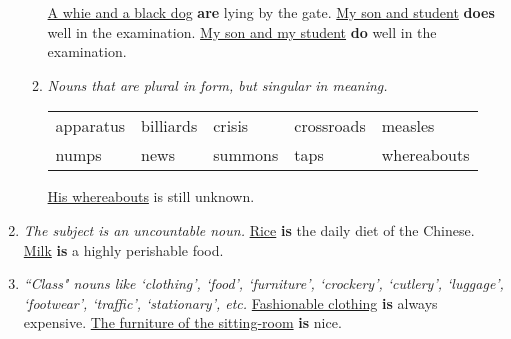 \begin{enumerate}
\begin{enumerate}
                \newline
                \underline{A whie and a black dog} \textbf{are} lying by the
                gate.
                \newline
                \newline
                \underline{My son and student} \textbf{does} well in the examination.
                \newline
                \underline{My son and my student} \textbf{do} well in the
                examination.
            \item
                {\it
                Nouns that are plural in form, but singular in meaning.
                }
                \newline
                \begin{tabular}{lllll}
                    apparatus & billiards & crisis & crossroads & measles \\
                    numps & news & summons & taps & whereabouts
                \end{tabular}
                \newline
                \newline
                \underline{His whereabouts} is still unknown.
        \end{enumerate}
    \item
        {\it
        The subject is an uncountable noun.
        }
        \newline
        \newline
        \underline{Rice} \textbf{is} the daily diet of the Chinese.
        \newline
        \newline
        \underline{Milk} \textbf{is} a highly perishable food.
    \item
        {\it ``Class" nouns like `clothing', `food', `furniture', `crockery',
        `cutlery', `luggage', `footwear', `traffic', `stationary', etc.
        }
        \newline
        \newline
        \underline{Fashionable clothing} \textbf{is} always expensive.
        \newline
        \newline
        \underline{The furniture of the sitting-room} \textbf{is} nice.
        \newline

\end{enumerate}
